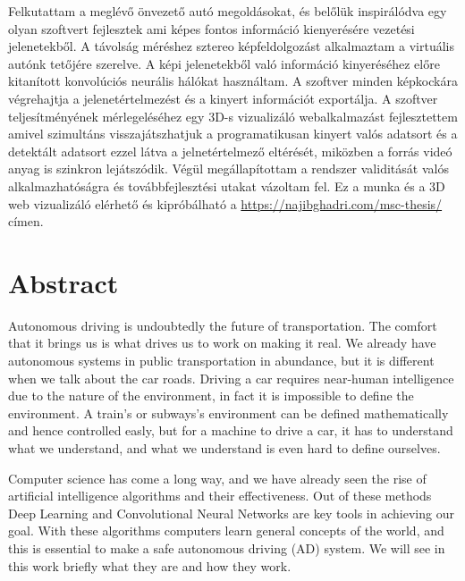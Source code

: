 Felkutattam a meglévő önvezető autó megoldásokat, és belőlük inspirálódva egy
olyan szoftvert fejlesztek ami képes fontos információ kienyerésére vezetési
jelenetekből. A távolság méréshez sztereo képfeldolgozást alkalmaztam a
virtuális autónk tetőjére szerelve. A képi jelenetekből való információ
kinyeréséhez előre kitanított konvolúciós neurális hálókat használtam. A szoftver minden
képkockára végrehajtja a jelenetértelmezést és a kinyert információt exportálja.
A szoftver teljesítményének mérlegeléséhez egy 3D-s vizualizáló webalkalmazást
fejlesztettem amivel szimultáns visszajátszhatjuk a programatikusan kinyert
valós adatsort és a detektált adatsort ezzel látva a jelnetértelmező eltérését,
miközben a forrás videó anyag is szinkron lejátszódik. Végül megállapítottam a
rendszer validitását valós alkalmazhatóságra és továbbfejlesztési utakat
vázoltam fel. Ez a munka és a 3D web vizualizáló elérhető és kipróbálható a
\url{https://najibghadri.com/msc-thesis/} címen.

\vfill
\selectenglish


\chapter*{Abstract}

Autonomous driving is undoubtedly the future of transportation. The comfort that
it brings us is what drives us to work on making it real. We already have
autonomous systems in public transportation in abundance, but it is different
when we talk about the car roads. Driving a car requires near-human intelligence
due to the nature of the environment, in fact it is impossible to define the
environment. A train's or subways's environment can be defined mathematically
and hence controlled easly, but for a machine to drive a car, it has to
understand what we understand, and what we understand is even hard to define
ourselves.

Computer science has come a long way, and we have already seen the rise of
artificial intelligence algorithms and their effectiveness. Out of these methods
Deep Learning and Convolutional Neural Networks are key tools in achieving our
goal. With these algorithms computers learn general concepts of the world, and
this is essential to make a safe autonomous driving (AD) system. We will see in
this work briefly what they are and how they work. 

